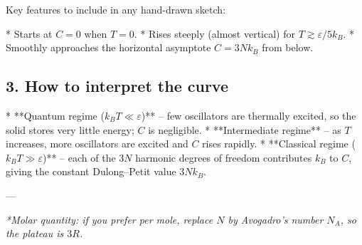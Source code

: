 \documentclass[12pt]{article}
\theoremstyle{definition} %
\theoremstyle{plain} %
\begin{document}
\noindent
Key features to include in any hand-drawn sketch:

* Starts at \(C=0\) when \(T=0\).  
* Rises steeply (almost vertical) for \(T\gtrsim \varepsilon/5k_B\).  
* Smoothly approaches the horizontal asymptote \(C=3Nk_B\) from below.  

\subsection*{3.  How to interpret the curve}

* **Quantum regime (\(k_BT\ll\varepsilon\))** – few oscillators are thermally
  excited, so the solid stores very little energy; \(C\) is negligible.
* **Intermediate regime** – as \(T\) increases, more oscillators are
  excited and \(C\) rises rapidly.
* **Classical regime (\(k_BT\gg\varepsilon\))** – each of the
  \(3N\) harmonic degrees of freedom contributes \(k_B\) to \(C\),
  giving the constant Dulong–Petit value \(3Nk_B\).

---

\emph{*Molar quantity: if you prefer per mole, replace \(N\) by
Avogadro’s number \(N_A\), so the plateau is \(3R\).}
\end{document}
